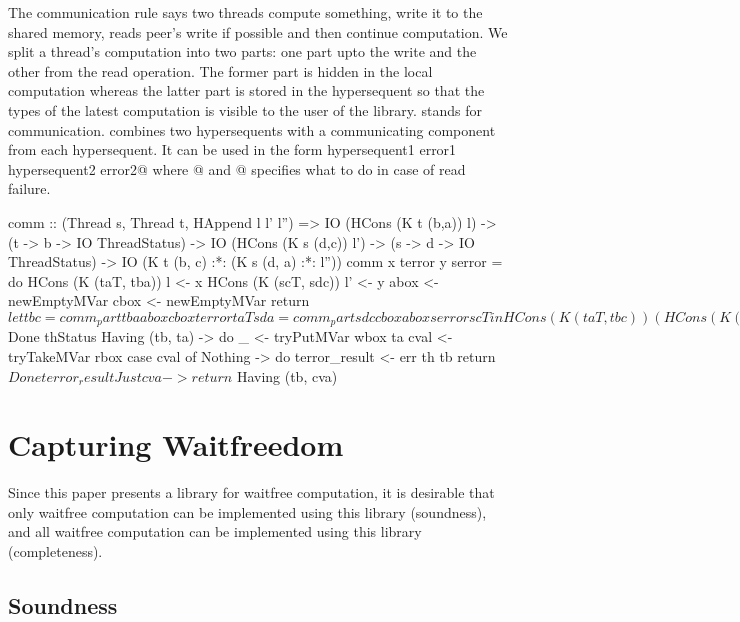 The communication rule says two threads compute something, write it to
the shared memory, reads peer's write if possible and then continue
computation. We split a thread's computation into two parts: one part
upto the write and the other from the read operation. The former part is
hidden in the local computation whereas the latter part is stored in the
hypersequent so that the types of the latest computation is visible to
the user of the library.
\verb@comm@ stands for communication.  \verb@comm@ combines two hypersequents with
a communicating component from each hypersequent.
It can be used in the form
\verb@comm hypersequent1 error1 hypersequent2 error2@ where @ and
@ specifies what to do in case of read failure.
\begin{code}
comm :: (Thread s, Thread t, HAppend l l' l'') =>
        IO (HCons (K t (b,a)) l)
         -> (t -> b -> IO ThreadStatus)
         -> IO (HCons (K s (d,c)) l')
         -> (s -> d -> IO ThreadStatus)
         -> IO (K t (b, c) :*: (K s (d, a) :*: l''))
comm x terror y serror = do
  HCons (K (taT, tba)) l <- x
  HCons (K (scT, sdc)) l' <- y
  abox <- newEmptyMVar
  cbox <- newEmptyMVar
  return $ let
      tbc = comm_part tba abox cbox terror taT
      sda = comm_part sdc cbox abox serror scT
    in
    HCons (K (taT, tbc))
      (HCons (K (scT, sda)) (hAppend l l'))
    where
      comm_part tba wbox rbox err th = do
            maybeba <- tba
            case maybeba of
              Done thStatus -> return $ Done thStatus
              Having (tb, ta) -> do
                _ <- tryPutMVar wbox ta
                cval <- tryTakeMVar rbox
                case cval of
                  Nothing -> do
                    terror_result <- err th tb
                    return $ Done terror_result
                  Just cva -> return $ Having (tb, cva)
\end{code}

\section{Capturing Waitfreedom}

Since this paper presents a library for waitfree computation, it is
desirable that only waitfree computation can be implemented using this
library (soundness), and all waitfree computation can be implemented
using this library (completeness).

\subsection{Soundness}

